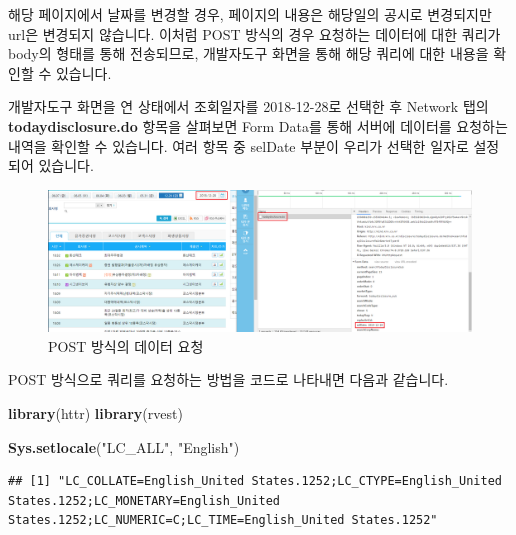\documentclass[]{book}
\newenvironment{Shaded}{\begin{snugshade}}{\end{snugshade}}
\newcommand{\KeywordTok}[1]{\textcolor[rgb]{0.13,0.29,0.53}{\textbf{#1}}}
\newcommand{\NormalTok}[1]{#1}
\newcommand{\StringTok}[1]{\textcolor[rgb]{0.31,0.60,0.02}{#1}}
\begin{document}
해당 페이지에서 날짜를 변경할 경우, 페이지의 내용은 해당일의 공시로 변경되지만 url은 변경되지 않습니다. 이처럼 POST 방식의 경우 요청하는 데이터에 대한 쿼리가 body의 형태를 통해 전송되므로, 개발자도구 화면을 통해 해당 쿼리에 대한 내용을 확인할 수 있습니다.

개발자도구 화면을 연 상태에서 조회일자를 2018-12-28로 선택한 후 Network 탭의 \textbf{todaydisclosure.do} 항목을 살펴보면 Form Data를 통해 서버에 데이터를 요청하는 내역을 확인할 수 있습니다. 여러 항목 중 selDate 부분이 우리가 선택한 일자로 설정되어 있습니다.

\begin{figure}

{\centering \includegraphics[width=1\linewidth]{images/crawl_kind_post} 

}

\caption{POST 방식의 데이터 요청}\label{fig:unnamed-chunk-12}
\end{figure}

POST 방식으로 쿼리를 요청하는 방법을 코드로 나타내면 다음과 같습니다.

\begin{Shaded}
\begin{Highlighting}[]
\KeywordTok{library}\NormalTok{(httr)}
\KeywordTok{library}\NormalTok{(rvest)}

\KeywordTok{Sys.setlocale}\NormalTok{(}\StringTok{"LC_ALL"}\NormalTok{, }\StringTok{"English"}\NormalTok{)}
\end{Highlighting}
\end{Shaded}

\begin{verbatim}
## [1] "LC_COLLATE=English_United States.1252;LC_CTYPE=English_United States.1252;LC_MONETARY=English_United States.1252;LC_NUMERIC=C;LC_TIME=English_United States.1252"
\end{verbatim}
\end{document}
